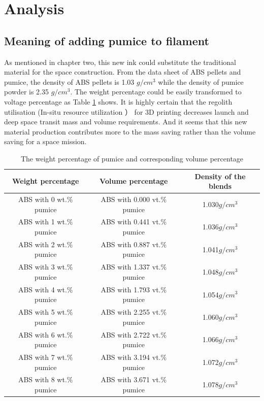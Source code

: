 \section{Analysis}
\subsection{Meaning of adding pumice to filament}
As mentioned in chapter two, this new ink could substitute the traditional material for the space construction. From the data sheet of ABS pellets and pumice, the density of ABS pellets is 1.03 $g/cm^3$ while the density of pumice powder is 2.35 $g/cm^3$. The weight percentage could be easily transformed to voltage percentage as Table \ref{tab:ABS pumice} shows. It is highly certain that the regolith utilisation (In-situ resource utilization ） for 3D printing decreases launch and deep space transit mass and volume requirements. And it seems that this new material production contributes more to the mass saving rather than the volume saving for a space mission.  \\
\begin{table}[htbp]
\centering
\caption{The weight percentage of pumice and corresponding volume percentage}
\begin{tabular}{c  c  c}
\hline
\textbf{Weight percentage} & \textbf{Volume percentage }& \textbf{Density of the blends}\\
\hline
ABS with 0 wt.$\%$ pumice &  ABS with 0.000 vt.$\%$ pumice  &  1.030$g/cm^3$  \\
ABS with 1 wt.$\%$ pumice &  ABS with 0.441 vt.$\%$ pumice  &  1.036$g/cm^3$  \\
ABS with 2 wt.$\%$ pumice &  ABS with 0.887 vt.$\%$ pumice  &  1.041$g/cm^3$  \\
ABS with 3 wt.$\%$ pumice &  ABS with 1.337 vt.$\%$ pumice  &  1.048$g/cm^3$  \\
ABS with 4 wt.$\%$ pumice &  ABS with 1.793 vt.$\%$ pumice  &  1.054$g/cm^3$  \\
ABS with 5 wt.$\%$ pumice &  ABS with 2.255 vt.$\%$ pumice  &  1.060$g/cm^3$  \\
ABS with 6 wt.$\%$ pumice &  ABS with 2.722 vt.$\%$ pumice  &  1.066$g/cm^3$  \\
ABS with 7 wt.$\%$ pumice &  ABS with 3.194 vt.$\%$ pumice  &  1.072$g/cm^3$  \\
ABS with 8 wt.$\%$ pumice &  ABS with 3.671 vt.$\%$ pumice   & 1.078$g/cm^3$ \\
\hline
\end{tabular}
\label{tab:ABS pumice}
\end{table}


